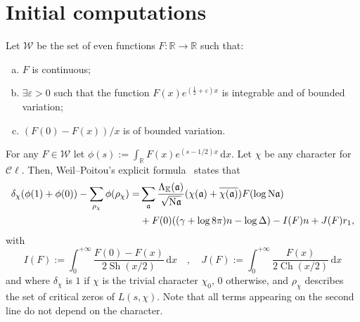 \documentclass[a4paper,11pt]{amsart}
\newcommand{\field}[1]{\mathbb{{#1}}}
\newcommand{\ideal}[1]{\mathfrak{{#1}}}
\newcommand{\R}{\field{R}}
\newcommand{\K}{\field{{K}}}
\renewcommand{\a}{\ideal{a}}
\newcommand{\Norm}{\textrm{\upshape N}}
\newcommand{\Cl}{\mathcal C\!\ell}
\newcommand{\dd}{\,\mathrm{d}}
\newcommand{\W}{\mathcal W}
\DeclareMathOperator{\Ch}{Ch}
\DeclareMathOperator{\Sh}{Sh}
\theoremstyle{remark}
\begin{document}
\section{Initial computations}\label{sec:2A}
Let $\W$ be the set of even functions $F\colon \R\to\R$ such that:
\begin{enumerate}[a)]
\item $F$ is continuous;
\item $\exists\varepsilon>0$ such that the function $F(x)e^{(\frac{1}{2}+\varepsilon)x}$ is integrable
      and of bounded variation;
\item $(F(0)-F(x))/x$ is of bounded variation.
\end{enumerate}
For any $F\in\W$ let $\phi(s):=\!\int_\R F(x)e^{(s-1/2)x}\dd x$. Let $\chi$ be any character for $\Cl$.
Then, Weil--Poitou's explicit formula~\cite{Poitou} states that
%
\begin{align}
\delta_{\chi}(\phi(1) + \phi(0)) - \sum_{\rho_\chi} \phi(\rho_\chi)
 =& \sum_{\a} \frac{\Lambda_{\K}(\a)}{\sqrt{\Norm\a}}(\chi(\a)+\overline{\chi(\a)}) F(\log \Norm\a)    \notag\\
& + F(0)((\gamma+\log 8\pi)n - \log \Delta)
  - I(F) n
  + J(F) r_1,                                                                                          \label{eq:3A}
\end{align}
%
with
\[
I(F):= \int_0^{+\infty} \frac{F(0) {-} F(x)}{2\Sh(x/2)}\dd x
%
\quad,\quad
%
J(F):= \int_0^{+\infty} \frac{F(x)}{2\Ch(x/2)}\dd x
\]
and where $\delta_{\chi}$ is $1$ if $\chi$ is the trivial character $\chi_0$, $0$ otherwise, and
$\rho_\chi$ describes the set of critical zeros of $L(s,\chi)$.
%
Note that all terms appearing on the second line do not depend on the character.
\end{document}
